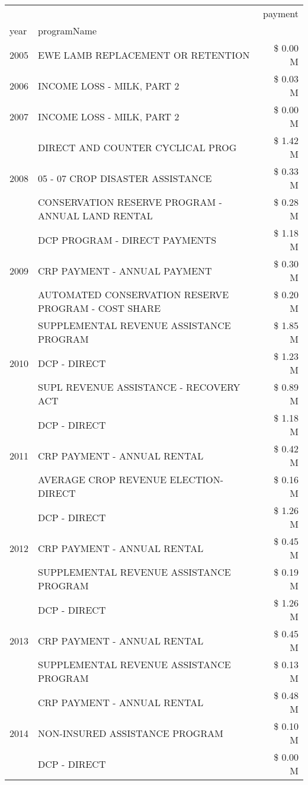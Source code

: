 \begin{tabular}{llr}
\toprule
 &  & payment \\
year & programName &  \\
\midrule
2005 & EWE LAMB REPLACEMENT OR RETENTION & \$ 0.00 M \\
\cline{1-3}
2006 & INCOME LOSS - MILK, PART 2 & \$ 0.03 M \\
\cline{1-3}
2007 & INCOME LOSS - MILK, PART 2 & \$ 0.00 M \\
\cline{1-3}
\multirow[t]{3}{*}{2008} & DIRECT AND COUNTER CYCLICAL PROG & \$ 1.42 M \\
 & 05 - 07 CROP DISASTER ASSISTANCE & \$ 0.33 M \\
 & CONSERVATION RESERVE PROGRAM - ANNUAL LAND RENTAL & \$ 0.28 M \\
\cline{1-3}
\multirow[t]{3}{*}{2009} & DCP PROGRAM - DIRECT PAYMENTS & \$ 1.18 M \\
 & CRP PAYMENT - ANNUAL PAYMENT & \$ 0.30 M \\
 & AUTOMATED CONSERVATION RESERVE PROGRAM - COST SHARE & \$ 0.20 M \\
\cline{1-3}
\multirow[t]{3}{*}{2010} & SUPPLEMENTAL REVENUE ASSISTANCE PROGRAM & \$ 1.85 M \\
 & DCP - DIRECT & \$ 1.23 M \\
 & SUPL REVENUE ASSISTANCE - RECOVERY ACT & \$ 0.89 M \\
\cline{1-3}
\multirow[t]{3}{*}{2011} & DCP - DIRECT & \$ 1.18 M \\
 & CRP PAYMENT - ANNUAL RENTAL & \$ 0.42 M \\
 & AVERAGE CROP REVENUE ELECTION-DIRECT & \$ 0.16 M \\
\cline{1-3}
\multirow[t]{3}{*}{2012} & DCP - DIRECT & \$ 1.26 M \\
 & CRP PAYMENT - ANNUAL RENTAL & \$ 0.45 M \\
 & SUPPLEMENTAL REVENUE ASSISTANCE PROGRAM & \$ 0.19 M \\
\cline{1-3}
\multirow[t]{3}{*}{2013} & DCP - DIRECT & \$ 1.26 M \\
 & CRP PAYMENT - ANNUAL RENTAL & \$ 0.45 M \\
 & SUPPLEMENTAL REVENUE ASSISTANCE PROGRAM & \$ 0.13 M \\
\cline{1-3}
\multirow[t]{3}{*}{2014} & CRP PAYMENT - ANNUAL RENTAL & \$ 0.48 M \\
 & NON-INSURED ASSISTANCE PROGRAM & \$ 0.10 M \\
 & DCP - DIRECT & \$ 0.00 M \\

\end{tabular}
